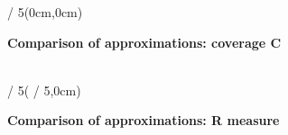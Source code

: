 \begin{textblock*}{\posterboxwidth / 5}(0cm,0cm)

\def\figscale{.6}
\def\figfontsize{\small}

\newcommand\tikzbox[1]{%
\scalebox{\figscale}{%
\begin{tikzpicture}[font=\figfontsize]

\end{tikzpicture}}%
}

\centering%
\textbf{Comparison of approximations: coverage C}\\[.5em]

\tikzbox{vector/QualityMeasures_C1}\\
\tikzbox{vector/QualityMeasures_C2}

\end{textblock*}


\begin{textblock*}{\posterboxwidth / 5}( / 5,0cm)

\def\figscale{.6}
\def\figfontsize{\small}

\newcommand\tikzbox[1]{%
\scalebox{\figscale}{%
\begin{tikzpicture}[font=\figfontsize]

\end{tikzpicture}}%
}

\centering%
\textbf{Comparison of approximations: R measure}\\[.5em]

\tikzbox{vector/QualityMeasures_R1}\\
\tikzbox{vector/QualityMeasures_R2}

\end{textblock*}


